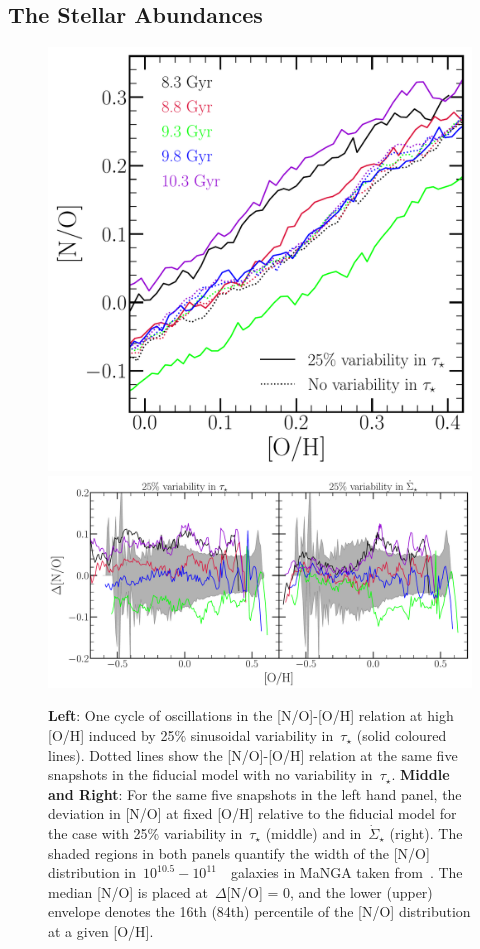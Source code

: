 \documentclass[ms.tex]{subfiles}
\begin{document}
\subsection{The Stellar Abundances}  
\label{sec:results:vincenzo_comp} 

\begin{figure} 
\centering 
\includegraphics[scale = 0.31]{no_oh_sfevar.pdf} 
\includegraphics[scale = 0.33]{delta_no_schaefercomp.pdf} 
\caption{
\textbf{Left}: One cycle of oscillations in the [N/O]-[O/H] relation at high 
[O/H] induced by 25\% sinusoidal variability in~$\tau_\star$ (solid coloured 
lines). 
Dotted lines show the [N/O]-[O/H] relation at the same five snapshots in the 
fiducial model with no variability in~$\tau_\star$. 
\textbf{Middle and Right}: For the same five snapshots in the left hand panel, 
the deviation in [N/O] at fixed [O/H] relative to the fiducial model for the 
case with 25\% variability in~$\tau_\star$ (middle) and in~$\dot{\Sigma}_\star$ 
(right). 
The shaded regions in both panels quantify the width of the [N/O] distribution 
in~$10^{10.5} - 10^{11}$~\msun~galaxies in MaNGA taken 
from~\citet{Schaefer2020}. 
The median [N/O] is placed at~$\Delta$[N/O] = 0, and the lower (upper) envelope 
denotes the 16th (84th) percentile of the [N/O] distribution at a given [O/H]. 
} 
\label{fig:schaefer_comp} 
\end{figure} 
\end{document}
